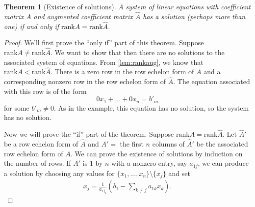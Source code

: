 \documentclass[12pt,reqno]{amsart}
\newcommand{\rank}{\mathrm{rank}}
\newtheorem{theorem}{Theorem}[section]
\theoremstyle{definition}
\begin{document}
\begin{theorem}[Existence of solutions]\label{thm:exist}
  A system of linear equations with coefficient matrix $A$ and
  augmented coefficient matrix $\hat{A}$ has a solution (perhaps more
  than one) if and only if $\rank A = \rank \hat{A}$.
\end{theorem}
\begin{proof}
  We'll first prove the ``only if'' part of this theorem. Suppose
  $\rank A \neq \rank \hat{A}$. We want to show that then there are no
  solutions to the associated system of equations. From
  \ref{lem:rankaug}, we know that $\rank A < \rank \hat{A}$. There is
  a zero row in the row echelon form of $A$ and a corresponding
  nonzero row in the row echelon form of $\hat{A}$. The equation
  associated with this row is of the form
  \[ 0 x_1 + ... + 0 x_n = b'_m \]
  for some $b'_m \neq 0$. As in the example, this equation has no
  solution, so the system has no solution. 

  Now we will prove the ``if'' part of the theorem. Suppose $\rank A =
  \rank \hat{A}$. Let $\hat{A}'$ be a row echelon form of $\hat{A}$
  and $A' = $ the first $n$ columns of $\hat{A}'$ be the associated
  row echelon form of $A$. We can prove the existence of solutions by
  induction on the number of rows. If $A'$ is $1$ by $n$ with a
  nonzero entry, say $a_{1j}$, we can produce a solution by choosing
  any values for $\{x_{1}, ... , x_{n}\} \setminus \{x_j\}$ and set
  \begin{align*}
    x_{j} = \frac{1}{a_{1j_1}} \left(b_1 - \sum_{k \neq j} a_{1k}
      x_{k} \right).
  \end{align*}
  

\end{proof}
\end{document}
